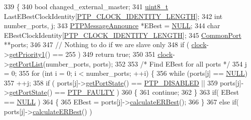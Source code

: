 \begin{DoxyCode}
339 \{
340     \textcolor{keywordtype}{bool} changed\_external\_master;
341     \hyperlink{stdint_8h_aba7bc1797add20fe3efdf37ced1182c5}{uint8\_t} LastEBestClockIdentity[\hyperlink{ptptypes_8hpp_afd1566058ed7927c2b790c9d4a0051ec}{PTP\_CLOCK\_IDENTITY\_LENGTH}];
342     \textcolor{keywordtype}{int} number\_ports, j;
343     \hyperlink{class_p_t_p_message_announce}{PTPMessageAnnounce} *EBest = \hyperlink{openavb__types__base__pub_8h_a070d2ce7b6bb7e5c05602aa8c308d0c4}{NULL};
344     \textcolor{keywordtype}{char} EBestClockIdentity[\hyperlink{ptptypes_8hpp_afd1566058ed7927c2b790c9d4a0051ec}{PTP\_CLOCK\_IDENTITY\_LENGTH}];
345     \hyperlink{class_common_port}{CommonPort} **ports;
346 
347     \textcolor{comment}{// Nothing to do if we are slave only}
348     \textcolor{keywordflow}{if} ( \hyperlink{class_common_port_aa2bc8731fa5aeb5b033feebc2b67258c}{clock}->\hyperlink{class_i_e_e_e1588_clock_a3577d05b0d34d976c23354585d7516ad}{getPriority1}() == 255 )
349         \textcolor{keywordflow}{return} \textcolor{keyword}{true};
350 
351     \hyperlink{class_common_port_aa2bc8731fa5aeb5b033feebc2b67258c}{clock}->\hyperlink{class_i_e_e_e1588_clock_a92094c4bd83a368921aef482e115f7df}{getPortList}(number\_ports, ports);
352 
353     \textcolor{comment}{/* Find EBest for all ports */}
354     j = 0;
355     \textcolor{keywordflow}{for} (\textcolor{keywordtype}{int} i = 0; i < number\_ports; ++i) \{
356         \textcolor{keywordflow}{while} (ports[j] == \hyperlink{openavb__types__base__pub_8h_a070d2ce7b6bb7e5c05602aa8c308d0c4}{NULL})
357             ++j;
358         \textcolor{keywordflow}{if} ( ports[j]->\hyperlink{class_common_port_aa4182d914fdb9a27fb875d8495e0289c}{getPortState}() == \hyperlink{ptptypes_8hpp_a679431f1afc75d7bb9e972c022e53672a38f3a091adeb361140c66f2f6dc44df7}{PTP\_DISABLED} ||
359              ports[j]->\hyperlink{class_common_port_aa4182d914fdb9a27fb875d8495e0289c}{getPortState}() == \hyperlink{ptptypes_8hpp_a679431f1afc75d7bb9e972c022e53672ac2e47460540ecdcec420be97a0bb9ff2}{PTP\_FAULTY} )
360         \{
361             \textcolor{keywordflow}{continue};
362         \}
363         \textcolor{keywordflow}{if}( EBest == \hyperlink{openavb__types__base__pub_8h_a070d2ce7b6bb7e5c05602aa8c308d0c4}{NULL} )
364         \{
365             EBest = ports[j]->\hyperlink{class_common_port_a6951410ed8e6a5ef44a028ef0a50cdeb}{calculateERBest}();
366         \}
367         \textcolor{keywordflow}{else} \textcolor{keywordflow}{if}( ports[j]->\hyperlink{class_common_port_a6951410ed8e6a5ef44a028ef0a50cdeb}{calculateERBest}() )

\end{DoxyCode}
